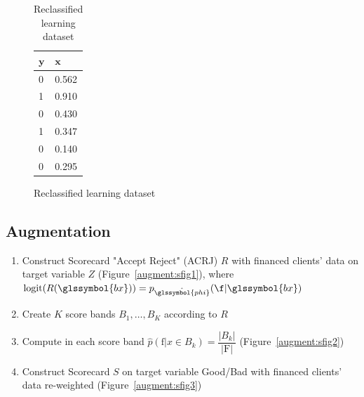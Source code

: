 \begin{table}
{\begin{multicols}{3}
\begin{subfigure}[t]{0.31\textwidth}
\begin{center}
\begin{adjustbox}{max width=\textwidth}
\begin{tabular}{l l}
\toprule
\textbf{${\bm{y}}$} & \textbf{${\bm{x}}$}\\
\midrule
0 & 0.562 \\
1 & 0.910 \\
0 & 0.430 \\
1 & 0.347 \\
0 & 0.140 \\
0 & 0.295 \\
\bottomrule
\end{tabular}
\end{adjustbox}
\end{center}
\caption{Reclassified learning dataset}
\label{reclass:sfig3}
\end{subfigure}

\end{multicols}
}
\end{table}


\subsection{Augmentation} \label{augmentation}

\begin{enumerate}
\item Construct Scorecard "Accept Reject" (ACRJ) $R$ with financed clients' data on target variable $Z$ (Figure~\ref{augment:sfig1}), where $\text{logit}(R(\glssymbol{bx})) = p_{\hat{\glssymbol{phi}}}(\f | \glssymbol{bx})$
\item Create $K$ score bands $B_1, \ldots, B_K$ according to $R$
\item Compute in each score band $\hat{p}(\text{f}|x \in B_k) = \dfrac{|B_k|}{|\text{F}|}$ (Figure~\ref{augment:sfig2})
\item Construct Scorecard $S$ on target variable Good/Bad with financed clients' data re-weighted (Figure~\ref{augment:sfig3})
\end{enumerate}

